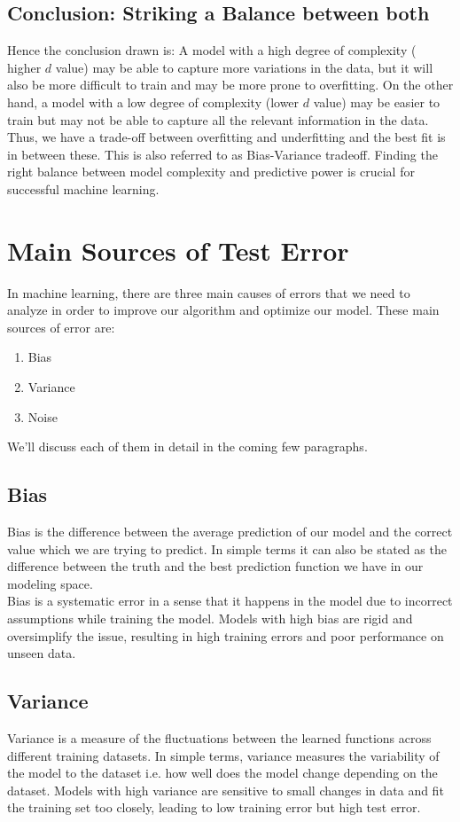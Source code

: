 \documentclass[12pt]{article}
\begin{document}
\subsection{Conclusion: Striking a Balance between both}
Hence the conclusion drawn is: A model with a high degree of complexity ( higher $d$ value) may be able to capture more variations in the data, but it will also be more difficult to train and may be more prone to overfitting. On the other hand, a model with a low degree of complexity (lower $d$ value) may be easier to train but may not be able to capture all the relevant information in the data. Thus, we have a trade-off between overfitting and underfitting and the best fit is in between these. This is also referred to as Bias-Variance tradeoff. Finding the right balance between model complexity and predictive power is crucial for successful machine learning. 


\section{Main Sources of Test Error}
In machine learning, there are three main causes of errors that we need to analyze in order to improve our algorithm and optimize our model. These main sources of error are:
\begin{enumerate}
    \item Bias
    \item Variance
    \item Noise
\end{enumerate}
We’ll discuss each of them in detail in the coming few paragraphs.

\subsection{Bias}
Bias is the difference between the average prediction of our model and the correct value which we are trying to predict. In simple terms it can also be stated as the difference between the truth and the best prediction function we have in our modeling space.\\ 
Bias is a systematic error in a sense that it happens in the model due to incorrect assumptions while training the model. Models with high bias are rigid and oversimplify the issue, resulting in high training errors and poor performance on unseen data.
\subsection{Variance}
Variance is a measure of the fluctuations between the learned functions across different training datasets. In simple terms, variance measures the variability of the model to the dataset i.e. how well does the model change depending on the dataset. Models with high variance are sensitive to small changes in data and fit the training set too closely, leading to low training error but high test error.
\end{document}

